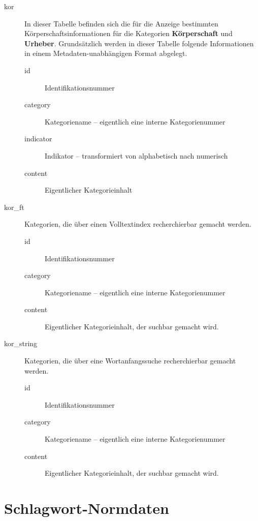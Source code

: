 \documentclass[11pt, twoside, a4paper, BCOR8mm, DIV12, bibtotoc,idxtotoc]{scrbook}
\begin{document}
\begin{description}
\item[kor] In dieser Tabelle befinden sich die für die Anzeige
  bestimmten Körperschaftsinformationen für die Kategorien
  \textbf{Körperschaft} und \textbf{Urheber}. Grundsätzlich werden in
  dieser Tabelle folgende Informationen in einem
  Metadaten-unabhängigen Format abgelegt.
  \begin{description}
  \item[id] Identifikationsnummer
  \item[category] Kategoriename -- eigentlich eine interne Kategorienummer
  \item[indicator] Indikator -- transformiert von alphabetisch nach numerisch
  \item[content] Eigentlicher Kategorieinhalt
  \end{description}
\item[kor\_ft] Kategorien, die über einen Volltextindex recherchierbar
  gemacht werden.
  \begin{description}
  \item[id] Identifikationsnummer
  \item[category] Kategoriename -- eigentlich eine interne Kategorienummer
  \item[content] Eigentlicher Kategorieinhalt, der suchbar gemacht wird.
  \end{description}
\item[kor\_string] Kategorien, die über eine Wortanfangssuche
  recherchierbar gemacht werden.
  \begin{description}
  \item[id] Identifikationsnummer
  \item[category] Kategoriename -- eigentlich eine interne Kategorienummer
  \item[content] Eigentlicher Kategorieinhalt, der suchbar gemacht wird.
  \end{description}
\end{description}

\section{Schlagwort-Normdaten}
\end{document}
